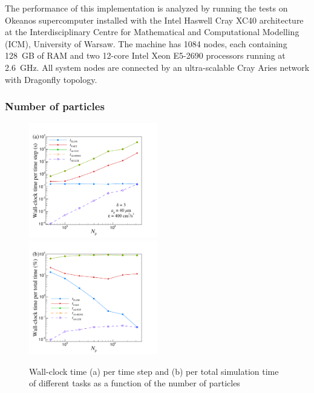 \documentclass[../thesis.tex]{subfiles}
\begin{document}
The performance of this implementation is analyzed by running the tests on Okeanos supercomputer installed with the Intel Haswell Cray XC40 architecture at the Interdisciplinary Centre for Mathematical and Computational Modelling (ICM), University of Warsaw. The machine has 1084 nodes, each containing 128~GB of RAM and two 12-core Intel Xeon E5-2690 processors running at 2.6~GHz. All system nodes are connected by an ultra-scalable Cray Aries network with Dragonfly topology.



\subsubsection{Number of particles}

\begin{figure}%
\includegraphics[trim=5mm 0mm 20mm 15mm, clip, width=0.5\textwidth]{./figs/PPAM/3a/CP022_fig3a.pdf}
\includegraphics[trim=5mm 0mm 20mm 15mm, clip, width=0.5\textwidth]{./figs/PPAM/3b/CP022_fig3b.pdf}
\caption{Wall-clock time (a) per time step and (b) per total simulation time of different tasks as a function of the number of particles}
\label{npart}
\end{figure}%
\end{document}
